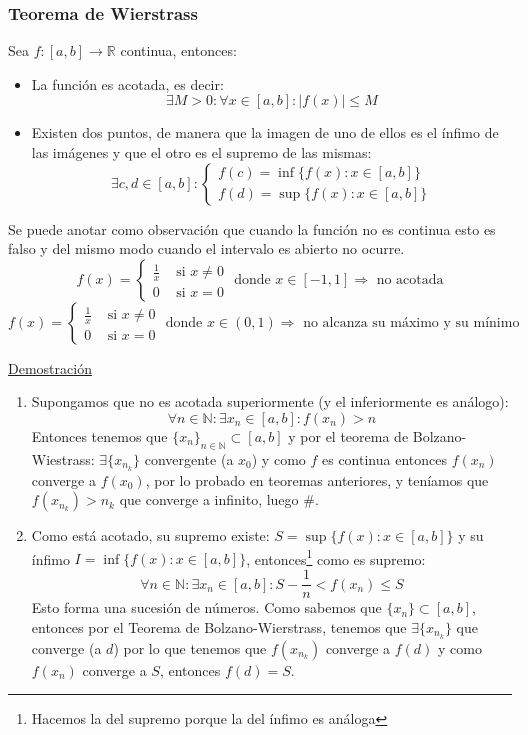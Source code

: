 \documentclass[10pt,a4paper,openright]{book}
\begin{document}
\subsubsection*{Teorema de Wierstrass}
Sea $f:[a,b] \rightarrow \mathbb R$ continua, entonces:
\begin{itemize}
\item La función es acotada, es decir:
$$\exists M>0: \forall x\in [a,b]: |f(x)|\leq M$$

\item Existen dos puntos, de manera que la imagen de uno de ellos es el ínfimo de las imágenes y que el otro es el supremo de las mismas:
$$\exists c,d\in [a,b]: \begin{cases} f(c)=\inf\{f(x): x\in [a,b]\} \\ f(d)=\sup\{f(x): x\in [a,b]\}\end{cases}$$

\end{itemize}
Se puede anotar como observación que cuando la función no es continua esto es falso y del mismo modo cuando el intervalo es abierto no ocurre.
$$f(x)=\begin{cases} \frac{1}{x} & \mbox{ si }x\neq 0 \\ 0 &\mbox{ si }x=0\end{cases} \mbox{ donde }x\in [-1,1]\Rightarrow \mbox{ no acotada}$$
$$f(x)=\begin{cases} \frac{1}{x} & \mbox{ si }x\neq 0 \\ 0 &\mbox{ si }x=0\end{cases} \mbox{ donde }x\in (0,1)\Rightarrow \mbox{ no alcanza su máximo y su mínimo}$$

\underline{Demostración}
\begin{enumerate}
\item Supongamos que no es acotada superiormente (y el inferiormente es análogo):
$$\forall n\in \mathbb N: \exists x_n\in [a,b]: f(x_n)>n$$
Entonces tenemos que $\{x_n\}_{n\in \mathbb N}\subset [a,b]$ y por el teorema de Bolzano-Wiestrass: $\exists \{x_{n_k}\}$ convergente (a $x_0$) y como $f$ es continua entonces $f(x_n)$ converge a $f(x_0)$, por lo probado en teoremas anteriores, y teníamos que $f(x_{n_k})>n_k$ que converge a infinito, luego \#.

\item Como está acotado, su supremo existe: $S=\sup\{f(x): x\in [a,b]\}$ y su ínfimo $I=\inf\{f(x): x\in [a,b]\}$, entonces\footnote{Hacemos la del supremo porque la del ínfimo es análoga} como es supremo:
$$\forall n\in \mathbb N: \exists x_n\in [a,b]: S-\frac{1}{n}<f(x_n)\leq S$$
Esto forma una sucesión de números. Como sabemos que $\{x_n\}\subset[a,b]$, entonces por el Teorema de Bolzano-Wierstrass, tenemos que $\exists \{x_{n_k}\}$ que converge (a $d$) por lo que tenemos que $f(x_{n_k})$ converge a $f(d)$ y como $f(x_n)$ converge a $S$, entonces $f(d)=S$.
\end{enumerate}
\end{document}
